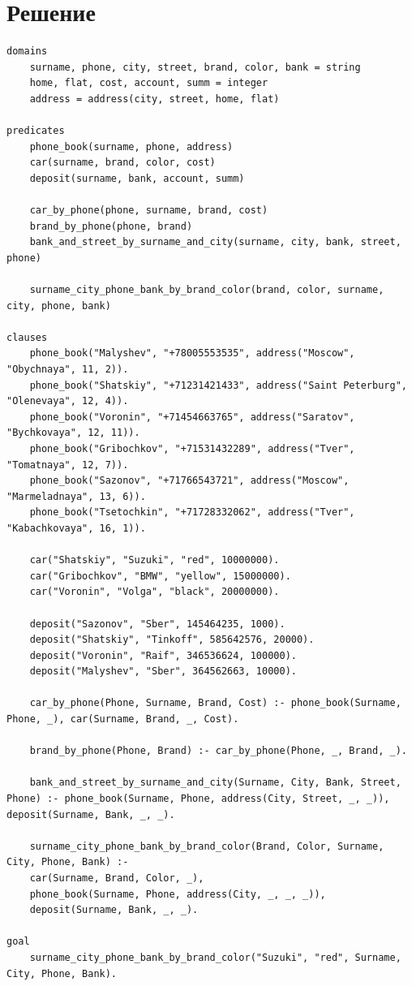\documentclass[12pt]{report}
\begin{document}
\section*{Решение}
\begin{lstlisting}
domains
	surname, phone, city, street, brand, color, bank = string
	home, flat, cost, account, summ = integer
	address = address(city, street, home, flat)
		
predicates
	phone_book(surname, phone, address)
	car(surname, brand, color, cost)
	deposit(surname, bank, account, summ)
	
	car_by_phone(phone, surname, brand, cost)
	brand_by_phone(phone, brand)
	bank_and_street_by_surname_and_city(surname, city, bank, street, phone)
	
	surname_city_phone_bank_by_brand_color(brand, color, surname, city, phone, bank)
		
clauses
	phone_book("Malyshev", "+78005553535", address("Moscow", "Obychnaya", 11, 2)).
	phone_book("Shatskiy", "+71231421433", address("Saint Peterburg", "Olenevaya", 12, 4)).
	phone_book("Voronin", "+71454663765", address("Saratov", "Bychkovaya", 12, 11)).
	phone_book("Gribochkov", "+71531432289", address("Tver", "Tomatnaya", 12, 7)).
	phone_book("Sazonov", "+71766543721", address("Moscow", "Marmeladnaya", 13, 6)).
	phone_book("Tsetochkin", "+71728332062", address("Tver", "Kabachkovaya", 16, 1)).
	
	car("Shatskiy", "Suzuki", "red", 10000000).
	car("Gribochkov", "BMW", "yellow", 15000000).
	car("Voronin", "Volga", "black", 20000000).
	
	deposit("Sazonov", "Sber", 145464235, 1000).
	deposit("Shatskiy", "Tinkoff", 585642576, 20000).
	deposit("Voronin", "Raif", 346536624, 100000).
	deposit("Malyshev", "Sber", 364562663, 10000).
	
	car_by_phone(Phone, Surname, Brand, Cost) :- phone_book(Surname, Phone, _), car(Surname, Brand, _, Cost).
	
	brand_by_phone(Phone, Brand) :- car_by_phone(Phone, _, Brand, _).
	
	bank_and_street_by_surname_and_city(Surname, City, Bank, Street, Phone) :- phone_book(Surname, Phone, address(City, Street, _, _)), deposit(Surname, Bank, _, _).
	
	surname_city_phone_bank_by_brand_color(Brand, Color, Surname, City, Phone, Bank) :-
	car(Surname, Brand, Color, _),
	phone_book(Surname, Phone, address(City, _, _, _)),
	deposit(Surname, Bank, _, _).
	
goal
	surname_city_phone_bank_by_brand_color("Suzuki", "red", Surname, City, Phone, Bank).
\end{lstlisting}
\end{document}
